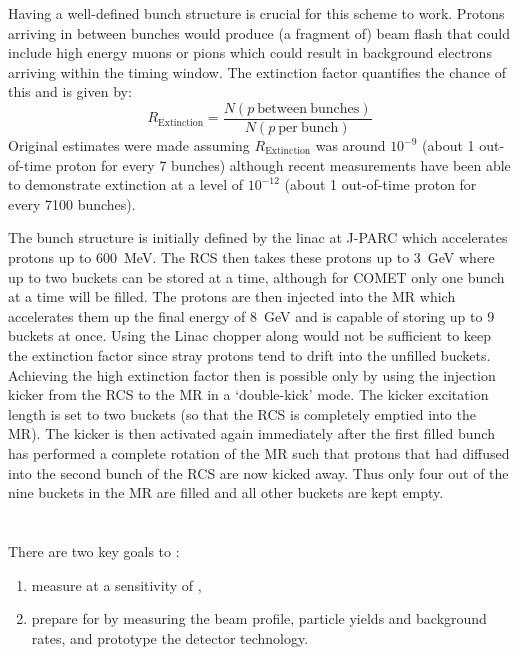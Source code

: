 Having a well-defined bunch structure is crucial for this scheme to work. 
Protons arriving in between bunches would produce (a fragment of) beam flash that could include high energy muons or pions which could result in background electrons arriving within the timing window.
The extinction factor quantifies the chance of this and is given by:
\begin{equation}
	R_\mathrm{Extinction}=\frac{N(p~\mathrm{between~bunches})}{N(p~\mathrm{per~bunch})}
\end{equation}
Original estimates were made assuming $R_\mathrm{Extinction}$ was around $10^{-9}$ \cite{CDRphase2} (about 1 out-of-time proton for every 7 bunches) although recent measurements have been able to demonstrate extinction at a level of $10^{-12}$ \cite{COMETExtinctionNote} (about 1 out-of-time proton for every 7100 bunches).

The bunch structure is initially defined by the linac at J-PARC which accelerates protons up to 600~MeV.
The \ac{RCS} then takes these protons up to 3~GeV where up to two buckets can be stored at a time, although for COMET only one bunch at a time will be filled.
The protons are then injected into the \ac{MR} which accelerates them up the final energy of 8~GeV and is capable of storing up to 9 buckets at once.
Using the Linac chopper along would not be sufficient to keep the extinction factor since stray protons tend to drift into the unfilled buckets.
Achieving the high extinction factor then is possible only by using the injection kicker from the \ac{RCS} to the \ac{MR} in a `double-kick' mode.
The kicker excitation length is set to two buckets (so that the \ac{RCS} is completely emptied into the \ac{MR}).  
The kicker is then activated again immediately after the first filled bunch has performed a complete rotation of the \ac{MR} such that protons that had diffused into the second bunch of the \ac{RCS} are now kicked away.
Thus only four out of the nine buckets in the \ac{MR} are filled and all other buckets are kept empty.

\section{\COMET \phaseI}
\FigPhaseI

There are two key goals to \phaseI:
\begin{enumerate}
\item measure \mueconv at a sensitivity of \sensePI,
\item prepare for \phaseII by measuring the beam profile, particle yields and background rates, and prototype the detector technology.
\end{enumerate}

